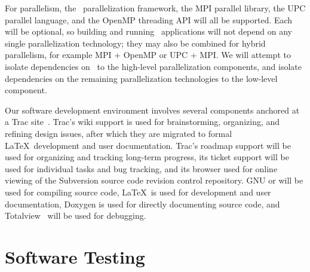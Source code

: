 \documentclass[11pt,letterpaper]{article}
\begin{document}
For parallelism, the \charm\ parallelization
framework, the MPI parallel library, the UPC parallel
language, and the OpenMP threading API will all be supported.  Each
will be optional, so building and running \cello\ applications will
not depend on any single parallelization technology; they may also be
combined for hybrid parallelism, for example MPI + OpenMP or UPC +
MPI.  We will attempt to isolate dependencies on \charm\ to the
high-level parallelization components, and isolate dependencies on the
remaining parallelization technologies to the low-level
 component.

Our software development environment involves several components anchored at a
Trac site~\cite{wwwtrac}.
Trac's wiki support is used for brainstorming, organizing, and
refining design issues, after which they are migrated to formal
\LaTeX\ development and user documentation.  Trac's roadmap support will be
used for organizing and tracking long-term progress, its ticket
support will be used for individual tasks and bug tracking, and its
browser used for online viewing of the Subversion source code revision
control repository.  GNU  or  will be used for compiling
source code, \LaTeX\ is
used for development and user documentation, Doxygen is used for
directly documenting source code, and Totalview~\cite{wwwtotalview} will
be used for debugging.

\section{Software Testing} \label{s:testing}


\end{document}
